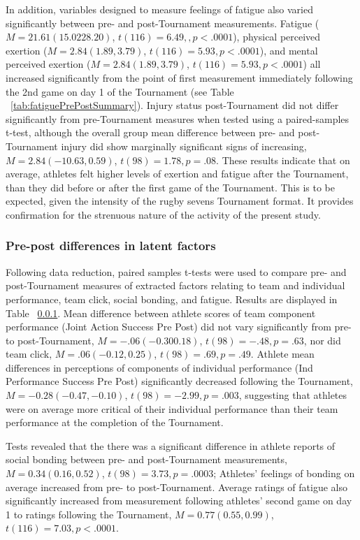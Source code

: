 In addition, variables designed to measure feelings of fatigue also varied significantly between pre- and post-Tournament measurements.  Fatigue ($M = 21.61 (15.02 28.20)$, $t(116)= 6.49,, p < .0001$), physical perceived exertion ($M = 2.84 (1.89, 3.79)$, $t(116)= 5.93, p < .0001$), and mental perceived exertion ($M = 2.84 (1.89, 3.79)$, $t(116)= 5.93, p < .0001$) all increased significantly from the point of first measurement immediately following the 2nd game on day 1 of the Tournament (see Table ~\ref{tab:fatiguePrePostSummary}).  Injury status post-Tournament did not differ significantly from pre-Tournament measures when tested using a paired-samples t-test, although the overall group mean difference between pre- and post-Tournament injury did show marginally significant signs of increasing, $M = 2.84 (-10.63, 0.59)$, $t(98)= 1.78, p = .08$.  These results indicate that on average, athletes felt higher levels of exertion and fatigue after the Tournament, than they did before or after the first game of the Tournament. This is to be expected, given the intensity of the rugby sevens Tournament format. It provides confirmation for the strenuous nature of the activity of the present study.


\subsubsection{Pre-post differences in latent factors}
Following data reduction, paired samples t-tests were used to compare pre- and post-Tournament measures of extracted factors relating to team and individual performance, team click, social bonding, and fatigue. Results are displayed in Table ~\ref{}.  Mean difference between athlete scores of team component performance (Joint Action Success Pre Post) did not vary significantly from pre- to post-Tournament, $M = -.06 (-0.30  0.18)$, $t(98)= -.48, p = .63$, nor did team click, $M = .06 (-0.12, 0.25)$, $t(98)= .69, p = .49$. Athlete mean differences in perceptions of components of individual performance (Ind Performance Success Pre Post) significantly decreased following the Tournament, $M = -0.28 (-0.47, -0.10)$, $t(98)= -2.99, p = .003$, suggesting that athletes were on average more critical of their individual performance than their team performance at the completion of the Tournament.

Tests revealed that the there was a significant difference in athlete reports of social bonding between pre- and post-Tournament measurements, $M = 0.34 (0.16, 0.52)$, $t(98)= 3.73, p = .0003$; Athletes' feelings of bonding on average increased from pre- to post-Tournament.  Average ratings of fatigue also significantly increased from measurement following athletes' second game on day 1 to ratings following the Tournament, $M =  0.77 (0.55, 0.99)$, $t(116)= 7.03, p < .0001$.


